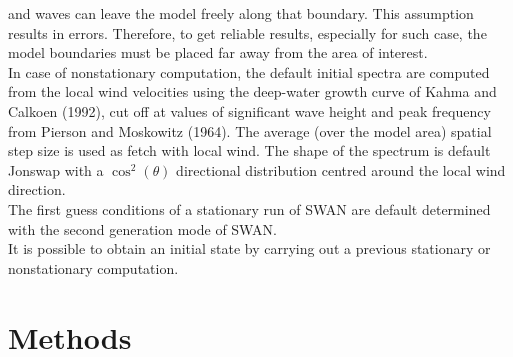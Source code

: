 \documentclass[12pt]{book}
\begin{document}
and waves can leave the model freely along that boundary. This assumption results in errors.
Therefore, to get reliable results, especially for such case, the model boundaries must be placed
far away from the area of interest.
\\[2ex]
\noindent
In case of nonstationary computation, the default initial spectra are computed from the local
wind velocities using the deep-water growth curve of Kahma and Calkoen (1992), cut off at values
of significant wave height and peak frequency from Pierson and Moskowitz (1964). The average
(over the model area) spatial step size is used as fetch with local wind. The shape of the
spectrum is default Jonswap with a $\cos^2 (\theta)$ directional distribution centred around
the local wind direction.
\\[2ex]
\noindent
The first guess conditions of a stationary run of SWAN are default determined with the second
generation mode of SWAN.
\\[2ex]
\noindent
It is possible to obtain an initial state by carrying out a previous stationary or nonstationary
computation.

 \label{ch:setup}

\section{Methods} \label{sec:meth}
\end{document}
